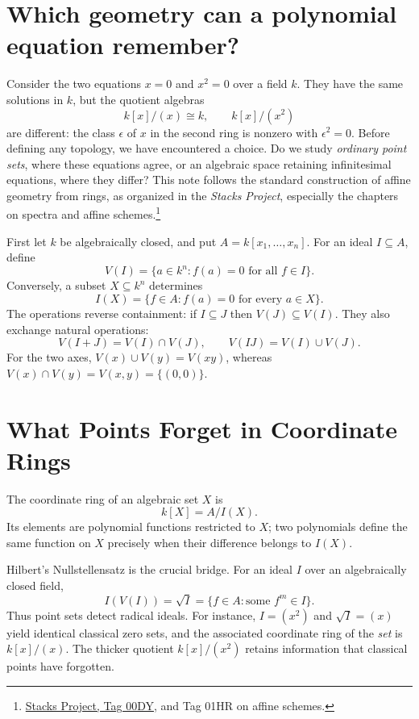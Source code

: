 
\section{Which geometry can a polynomial equation remember?}

Consider the two equations \(x=0\) and \(x^2=0\) over a field \(k\).
They have the same solutions in \(k\), but the quotient algebras
\[
 k[x]/(x)\cong k,\qquad k[x]/(x^2)
\]
are different: the class \(\epsilon\) of \(x\) in the second ring is nonzero with \(\epsilon^2=0\).  Before defining any topology, we have encountered a choice. Do we study \emph{ordinary point sets}, where these equations agree, or an algebraic space retaining infinitesimal equations, where they differ? This note follows the standard construction of affine geometry from rings, as organized in the \emph{Stacks Project}, especially the chapters on spectra and affine schemes.\footnote{\href{https://stacks.math.columbia.edu/tag/00DY}{Stacks Project, Tag 00DY}, and Tag 01HR on affine schemes.}

First let \(k\) be algebraically closed, and put \(A=k[x_1,\ldots,x_n]\).  For an ideal \(I\subseteq A\), define
\[
 V(I)=\{a\in k^n:f(a)=0\text{ for all }f\in I\}.
\]
Conversely, a subset \(X\subseteq k^n\) determines
\[
 I(X)=\{f\in A:f(a)=0\text{ for every }a\in X\}.
\]
The operations reverse containment: if \(I\subseteq J\) then \(V(J)\subseteq V(I)\).  They also exchange natural operations:
\[
 V(I+J)=V(I)\cap V(J),\qquad
 V(IJ)=V(I)\cup V(J).
\]
For the two axes, \(V(x)\cup V(y)=V(xy)\), whereas
\(V(x)\cap V(y)=V(x,y)=\{(0,0)\}\).

\section{What Points Forget in Coordinate Rings}

The coordinate ring of an algebraic set \(X\) is
\[
 k[X]=A/I(X).
\]
Its elements are polynomial functions restricted to \(X\); two polynomials define the same function on \(X\) precisely when their difference belongs to \(I(X)\).

Hilbert's Nullstellensatz is the crucial bridge. For an ideal \(I\) over an algebraically closed field,
\[
 \boxed{I(V(I))=\sqrt I
       =\{f\in A:\text{some }f^m\in I\}.}
\]
Thus point sets detect radical ideals. For instance, \(I=(x^2)\) and \(\sqrt I=(x)\) yield identical classical zero sets, and the associated coordinate ring of the \emph{set} is \(k[x]/(x)\). The thicker quotient \(k[x]/(x^2)\) retains information that classical points have forgotten.

